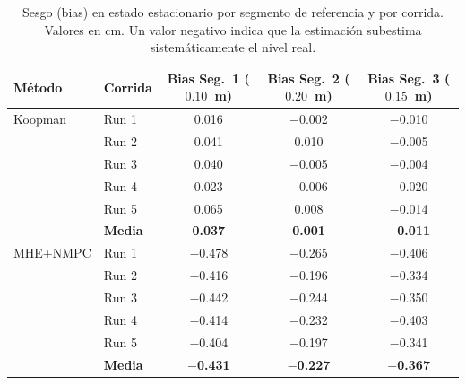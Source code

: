 \documentclass[12pt,letterpaper]{article}
\begin{document}
\begin{table}[H]
\centering
\caption{Sesgo (bias) en estado estacionario por segmento 
de referencia y por corrida. Valores en cm. Un valor 
negativo indica que la estimación subestima 
sistemáticamente el nivel real.}
\label{tab:seg_bias}
\footnotesize
\setlength{\tabcolsep}{4pt}
\begin{tabular}{llccc}
\toprule
\textbf{Método} & \textbf{Corrida} & 
\textbf{Bias Seg.~1 ($0.10$~m)} & 
\textbf{Bias Seg.~2 ($0.20$~m)} & 
\textbf{Bias Seg.~3 ($0.15$~m)} \\
\midrule
Koopman 
  & Run 1 & 0.016 & $-$0.002 & $-$0.010 \\
  & Run 2 & 0.041 & 0.010 & $-$0.005 \\
  & Run 3 & 0.040 & $-$0.005 & $-$0.004 \\
  & Run 4 & 0.023 & $-$0.006 & $-$0.020 \\
  & Run 5 & 0.065 & 0.008 & $-$0.014 \\
  & \textbf{Media} & \textbf{0.037} & \textbf{0.001} & 
    $-$\textbf{0.011} \\
\midrule
MHE+NMPC
  & Run 1 & $-$0.478 & $-$0.265 & $-$0.406 \\
  & Run 2 & $-$0.416 & $-$0.196 & $-$0.334 \\
  & Run 3 & $-$0.442 & $-$0.244 & $-$0.350 \\
  & Run 4 & $-$0.414 & $-$0.232 & $-$0.403 \\
  & Run 5 & $-$0.404 & $-$0.197 & $-$0.341 \\
  & \textbf{Media} & $-$\textbf{0.431} & $-$\textbf{0.227} & 
    $-$\textbf{0.367} \\
\bottomrule
\end{tabular}
\end{table}
\end{document}
